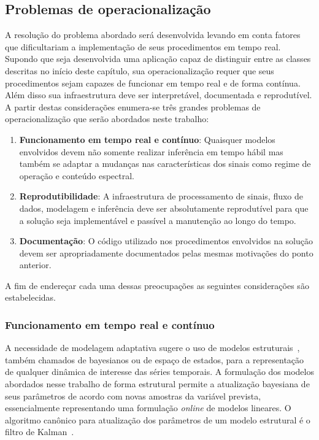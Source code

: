 \subsection{Problemas de operacionalização}

A resolução do problema abordado será desenvolvida levando em conta fatores que
dificultariam a implementação de seus procedimentos em tempo real. Supondo que
seja desenvolvida uma aplicação capaz de distinguir entre as classes descritas
no início deste capítulo, sua operacionalização requer que seus procedimentos
sejam capazes de funcionar em tempo real e de forma contínua. Além disso sua
infraestrutura deve ser interpretável, documentada e reprodutível. A partir
destas considerações enumera-se três grandes problemas de operacionalização
que serão abordados neste trabalho:

\begin{enumerate}
    \item \textbf{Funcionamento em tempo real e contínuo}: Quaisquer modelos
    envolvidos devem não somente realizar inferência em tempo hábil mas também
    se adaptar a mudanças nas características dos sinais como regime de
    operação e conteúdo espectral.
    \item \textbf{Reprodutibilidade}: A infraestrutura de processamento de
    sinais, fluxo de dados, modelagem e inferência deve ser absolutamente
    reprodutível para que a solução seja implementável e passível a manutenção
    ao longo do tempo.
    \item \textbf{Documentação}: O código utilizado nos procedimentos
    envolvidos na solução devem ser apropriadamente documentados pelas mesmas
    motivações do ponto anterior.
\end{enumerate}

A fim de endereçar cada uma dessas preocupações as seguintes considerações são
estabelecidas.

\subsubsection{Funcionamento em tempo real e contínuo}

A necessidade de modelagem adaptativa sugere o uso de modelos
estruturais~\cite{structural}, também chamados de bayesianos ou de espaço de
estados, para a representação de qualquer dinâmica de interesse das séries
temporais. A formulação dos modelos abordados nesse trabalho de forma
estrutural permite a atualização bayesiana de seus parâmetros de acordo com
novas amostras da variável prevista, essencialmente representando uma
formulação \emph{online} de modelos lineares. O algoritmo canônico para
atualização dos parâmetros de um modelo estrutural é o filtro de
Kalman~\cite{kalman}.

